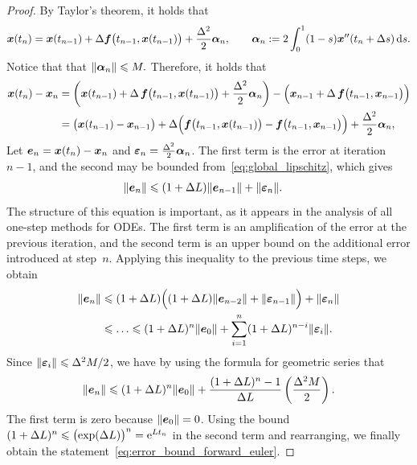 \begin{proof}
    By Taylor's theorem,
    it holds that
    \[
        \mathbf{\boldsymbol{x}}(t_{n}) = \mathbf{\boldsymbol{x}}(t_{n-1}) + \Delta \mathbf{\boldsymbol{f}}\bigl(t_{n-1}, \mathbf{\boldsymbol{x}}(t_{n-1})\bigr) + \frac{\Delta^2}{2} \mathbf{\boldsymbol{\alpha}}_n,
        \qquad
        \mathbf{\boldsymbol{\alpha}}_n := 2 \int_{0}^{1} (1 - s) \mathbf{\boldsymbol{x}}''(t_n + \Delta s) \, \mathrm d s.
    \]
    Notice that that $\lVert\mathbf{\boldsymbol{\alpha}}_n\rVert \leqslant M.$
    Therefore, it holds that
    \begin{align*}
        \mathbf{\boldsymbol{x}}(t_{n}) - \mathbf{\boldsymbol{x}}_{n}
        &= \left( \mathbf{\boldsymbol{x}}(t_{n-1}) + \Delta \, \mathbf{\boldsymbol{f}}\bigl(t_{n-1}, \mathbf{\boldsymbol{x}}(t_{n-1})\bigr) + \frac{\Delta^2}{2} \mathbf{\boldsymbol{\alpha}}_n \right)
        - \Bigl( \mathbf{\boldsymbol{x}}_{n-1} + \Delta \, \mathbf{\boldsymbol{f}}\bigl(t_{n-1}, \mathbf{\boldsymbol{x}}_{n-1}\bigr) \Bigr) \\
        &= \bigl(\mathbf{\boldsymbol{x}}(t_{n-1}) - \mathbf{\boldsymbol{x}}_{n-1}\bigr) + \Delta \Bigl( \mathbf{\boldsymbol{f}}\bigl(t_{n-1}, \mathbf{\boldsymbol{x}}(t_{n-1})\bigr) - \mathbf{\boldsymbol{f}}\bigl(t_{n-1}, \mathbf{\boldsymbol{x}}_{n-1}\bigr) \Bigr) + \frac{\Delta^2}{2} \mathbf{\boldsymbol{\alpha}}_n,
    \end{align*}
    Let $\mathbf{\boldsymbol{e}}_n = \mathbf{\boldsymbol{x}}(t_n) - \mathbf{\boldsymbol{x}}_n$ and $\mathbf{\boldsymbol{\varepsilon}}_n = \frac{\Delta^2}{2} \mathbf{\boldsymbol{\alpha}}_n$.
    The first term is the error at iteration~$n-1$,
    and the second may be bounded from~\eqref{eq:global_lipschitz},
    which gives
    \begin{align*}
        \lVert\mathbf{\boldsymbol{e}}_{n}\rVert
        &\leqslant (1 + \Delta L) \lVert\mathbf{\boldsymbol{e}}_{n-1}\rVert
        + \lVert\mathbf{\boldsymbol{\varepsilon}}_n\rVert.
    \end{align*}
    The structure of this equation is important,
    as it appears in the analysis of all one-step methods for ODEs.
    The first term is an amplification of the error at the previous iteration,
    and the second term is an upper bound on the additional error introduced at step~$n$.
    Applying this inequality to the previous time steps, we obtain
    \begin{align}
        \nonumber
        \lVert\mathbf{\boldsymbol{e}}_{n}\rVert
        &\leqslant (1 + \Delta L) \Bigl( (1 + \Delta L) \lVert\mathbf{\boldsymbol{e}}_{n-2}\rVert + \lVert\mathbf{\boldsymbol{\varepsilon}}_{n-1}\rVert \Bigr) + \lVert\mathbf{\boldsymbol{\varepsilon}}_{n}\rVert \\
        \label{eq:sum_local_and_accumulation}
        &\leqslant \dotsc
        \leqslant (1 + \Delta L)^{n} \lVert\mathbf{\boldsymbol{e}}_{0}\rVert + \sum_{i=1}^{n} (1 + \Delta L)^{n-i} \lVert\mathbf{\boldsymbol{\varepsilon}}_{i}\rVert.
    \end{align}
    Since $\lVert\mathbf{\boldsymbol{\varepsilon}}_i\rVert \leqslant \Delta^2M/2$,
    we have by using the formula for geometric series that
    \[
        \lVert\mathbf{\boldsymbol{e}}_{n}\rVert
        \leqslant (1 + \Delta L)^{n} \lVert\mathbf{\boldsymbol{e}}_{0}\rVert + \frac{(1+\Delta L)^{n} - 1}{\Delta L} \left( \frac{\Delta^2 M}{2} \right).
    \]
    The first term is zero because $\lVert\mathbf{\boldsymbol{e}}_{0}\rVert = 0$.
    Using the bound $(1+\Delta L)^n \leqslant \bigl(\exp(\Delta L)\bigr)^n = \mathrm e^{L t_n}$ in the second term and rearranging,
    we finally obtain the statement~\eqref{eq:error_bound_forward_euler}.
\end{proof}

